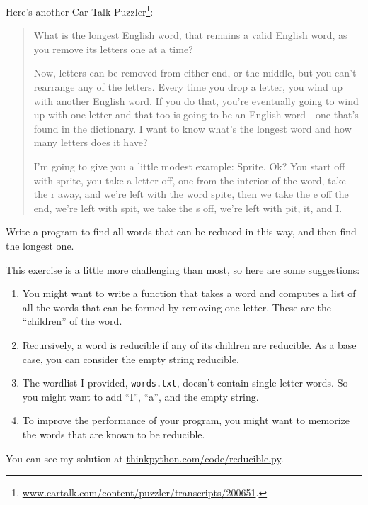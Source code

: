 \begin{exercise}


Here's another Car Talk Puzzler\footnote{
\url{www.cartalk.com/content/puzzler/transcripts/200651}.}:

\begin{quote}
What is the longest English word, that remains a valid English word,
as you remove its letters one at a time?

Now, letters can be removed from either end, or the middle, but you
can't rearrange any of the letters. Every time you drop a letter, you
wind up with another English word. If you do that, you're eventually
going to wind up with one letter and that too is going to be an
English word---one that's found in the dictionary. I want to know
what's the longest word and how many letters does it
have?

I'm going to give you a little modest example: Sprite. Ok? You start
off with sprite, you take a letter off, one from the interior of the
word, take the r away, and we're left with the word spite, then we
take the e off the end, we're left with spit, we take the s off, we're
left with pit, it, and I.
\end{quote}


Write a program to find all words that can be reduced in this way,
and then find the longest one.

This exercise is a little more challenging than most, so here are
some suggestions:

\begin{enumerate}

\item You might want to write a function that takes a word and
  computes a list of all the words that can be formed by removing one
  letter.  These are the ``children'' of the word.


\item Recursively, a word is reducible if any of its children
are reducible.  As a base case, you can consider the empty
string reducible.

\item The wordlist I provided, {\tt words.txt}, doesn't
contain single letter words.  So you might want to add
``I'', ``a'', and the empty string.

\item To improve the performance of your program, you might want
to memorize the words that are known to be reducible.

\end{enumerate}

You can see my solution at \url{thinkpython.com/code/reducible.py}.

\end{exercise}







